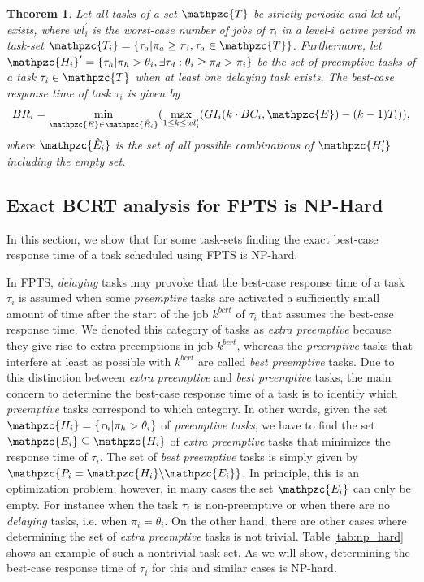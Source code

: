 \documentclass[fleqn]{article}
\newtheorem{theorem}{Theorem}
\begin{document}
\begin{theorem} \label{thm:exact_bcrt}
	 Let all tasks of a set  $\mathpzc{T}$ be strictly periodic and let $wl^{\prime}_i$ exists, where $wl^{\prime}_i$ is the worst-case number of jobs of $\tau_i$ in a level-$i$ active period in task-set $\mathpzc{T_i}=\{\tau_a | \pi_a \geq \pi_i, \tau_a \in \mathpzc{T} \}$. Furthermore, let  $\mathpzc{H_i}^{\prime} = \{\tau_h | \pi_h > \theta_i, \exists \tau_d : \theta_i \geq \pi_d > \pi_i \}$ be the set of preemptive tasks of a task $\tau_i \in \mathpzc{T}$ when at least one delaying task exists. The best-case response time of task $\tau_i$ is given by
	 \begin{align}
	 	BR_i = \min\limits_{\mathpzc{E}\in\mathpzc{\hat{E}_i}}(\max \limits_{1 \leq k \leq wl^{\prime}_i} (GI_i(k \cdot BC_i, \mathpzc{E}) - (k-1)T_i)),
	 \end{align}
	 where $\mathpzc{\hat{E}_i}$ is the set of all possible combinations of $\mathpzc{H^{\prime}_i}$ including the empty set.
\end{theorem}


\subsection{Exact BCRT analysis for FPTS is NP-Hard}

In this section, we show that for some task-sets finding the exact best-case response time of a task scheduled using FPTS is NP-hard.

In FPTS, \textit{delaying} tasks may provoke that the best-case response time of a task $\tau_i$ is assumed when some \textit{preemptive} tasks are activated a sufficiently small amount of time after the start of the job $k^{bcrt}$ of $\tau_i$ that assumes the best-case response time. We denoted this category of tasks as \textit{extra preemptive} because they give rise to extra preemptions in job  $k^{bcrt}$, whereas the \textit{preemptive} tasks that interfere at least as possible with $k^{bcrt}$ are called \textit{best preemptive} tasks. Due to this distinction between \textit{extra preemptive} and \textit{best preemptive} tasks, the main concern to determine the best-case response time of a task is to identify which \textit{preemptive} tasks correspond to which category. In other words, given the set $ \mathpzc{H_i} = \{\tau_h | \pi_h > \theta_i\}$ of \textit{preemptive tasks}, we have to find the set $\mathpzc{E_i} \subseteq \mathpzc{H_i}$ of \textit{extra preemptive} tasks that minimizes the response time of $\tau_i$. The set of \textit{best preemptive} tasks is simply given by $\mathpzc{P_i =  \mathpzc{H_i} \backslash \mathpzc{E_i}}$. In principle, this is an optimization problem; however, in many cases the set $\mathpzc{E_i}$ can only be empty. For instance when the task $\tau_i$ is non-preemptive or when there are no \textit{delaying} tasks, i.e. when $\pi_i = \theta_i$. On the other hand, there are other cases where determining the set of \textit{extra preemptive} tasks is not trivial. Table \ref{tab:np_hard} shows an example of such a nontrivial task-set. As we will show, determining the best-case response time of $\tau_i$ for this and similar cases is NP-hard.
\end{document}
